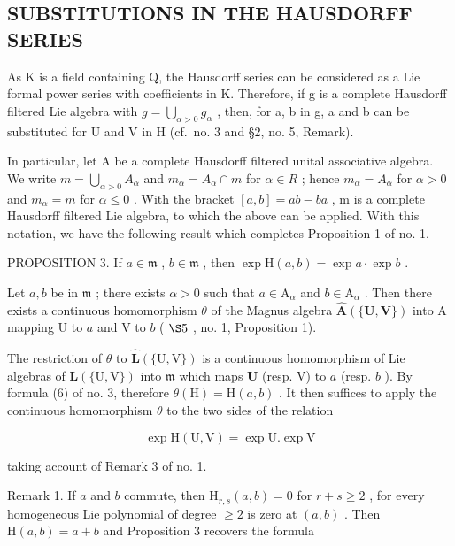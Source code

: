 \subsection{SUBSTITUTIONS IN THE HAUSDORFF SERIES}

As K is a field containing Q, the Hausdorff series can be considered as a Lie formal power series with coefficients in K. Therefore, if g is a complete Hausdorff filtered Lie algebra with \(g = \bigcup_{\alpha > 0} g_{\alpha}\) , then, for a, b in g, a and b can be substituted for U and V in H (cf.~no. 3 and §2, no. 5, Remark).

In particular, let A be a complete Hausdorff filtered unital associative algebra. We write \(m = \bigcup_{\alpha > 0} A_{\alpha}\) and \(m_{\alpha} = A_{\alpha} \cap m\) for \(\alpha \in R\) ; hence \(m_{\alpha} = A_{\alpha}\) for \(\alpha > 0\) and \(m_{\alpha} = m\) for \(\alpha \leqslant 0\) . With the bracket \([a, b] = ab - ba\) , m is a complete Hausdorff filtered Lie algebra, to which the above can be applied. With this notation, we have the following result which completes Proposition 1 of no. 1.

PROPOSITION 3. If \(a \in \mathfrak{m}\) , \(b \in \mathfrak{m}\) , then \(\exp \mathrm{H}(a, b) = \exp a \cdot \exp b\) .

Let \(a, b\) be in \(\mathfrak{m}\) ; there exists \(\alpha > 0\) such that \(a \in \mathrm{A}_{\alpha}\) and \(b \in \mathrm{A}_{\alpha}\) . Then there exists a continuous homomorphism \(\theta\) of the Magnus algebra \(\hat{\mathbf{A}}(\{\mathbf{U},\mathbf{V}\})\) into A mapping U to \(a\) and V to \(b\) ( \(\S 5\) , no. 1, Proposition 1).

The restriction of \(\theta\) to \(\hat{\mathbf{L}}(\{\mathrm{U},\mathrm{V}\})\) is a continuous homomorphism of Lie algebras of \(\mathbf{L}(\{\mathrm{U},\mathrm{V}\})\) into \(\mathfrak{m}\) which maps \(\mathbf{U}\) (resp. V) to \(a\) (resp. \(b\) ). By formula (6) of no. 3, therefore \(\theta (\mathrm{H}) = \mathrm{H}(a,b)\) . It then suffices to apply the continuous homomorphism \(\theta\) to the two sides of the relation

\[
\exp \mathrm{H} (\mathrm{U}, \mathrm{V}) = \exp \mathrm{U}. \exp \mathrm{V}
\]

taking account of Remark 3 of no. 1.

Remark 1. If \(a\) and \(b\) commute, then \(\mathrm{H}_{r,s}(a,b) = 0\) for \(r + s \geqslant 2\) , for every homogeneous Lie polynomial of degree \(\geqslant 2\) is zero at \((a,b)\) . Then \(\mathrm{H}(a,b) = a + b\) and Proposition 3 recovers the formula

